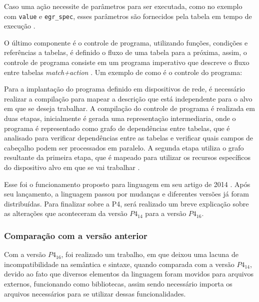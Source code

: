 \documentclass[12pt,
openright, 
oneside,
a4paper,
brazil]{facom-ufu-abntex2}
\theoremstyle{definition}
\begin{document}


Caso uma ação necessite de parâmetros para ser executada, como no exemplo com
\texttt{value} e \texttt{egr\_spec}, esses parâmetros são fornecidos pela tabela em tempo 
de execução \citep{bosshart2014p4}.

O último componente é o controle de programa, utilizando funções, condições e referências
a tabelas, é definido o fluxo de uma tabela para a próxima, assim, o controle de programa
consiste em um programa imperativo que descreve o fluxo entre tabelas \textit{match+action} 
\citep{bosshart2014p4}. Um exemplo de como é o controle do programa: 



Para a implantação do programa definido em dispositivos de rede, é necessário realizar
a compilação para mapear a descrição que está independente para o alvo em que se deseja
trabalhar. A compilação do controle de programa é realizada em duas etapas, inicialmente
é gerada uma representação intermediaria, onde o programa é representado como grafo de
dependências entre tabelas, que é analisado para verificar dependências entre as tabelas
e verificar quais campos de cabeçalho podem ser processados em paralelo. A segunda etapa
utiliza o grafo resultante da primeira etapa, que é mapeado para utilizar os recursos
específicos do dispositivo alvo em que se vai trabalhar \citep{bosshart2014p4}.

Esse foi o funcionamento proposto para linguagem em seu artigo de 2014 \citep{bosshart2014p4}.
Após seu lançamento, a linguagem passou por mudanças e diferentes versões já foram 
distribuídas. Para finalizar sobre a P4, será realizado um breve explicação sobre as
alterações que aconteceram da versão $P4_{14}$ para a versão $P4_{16}$.

\subsubsection{Comparação com a versão anterior}
Com a versão $P4_{16}$, foi realizado um trabalho, em que deixou uma lacuna de
incompatibilidade na semântica e sintaxe, quando comparada com a versão
$P4_{14}$, devido ao fato que diversos elementos da linguagem foram movidos
para arquivos externos, funcionando como bibliotecas, assim sendo necessário
importa os arquivos necessários para se utilizar dessas funcionalidades.
\end{document}
